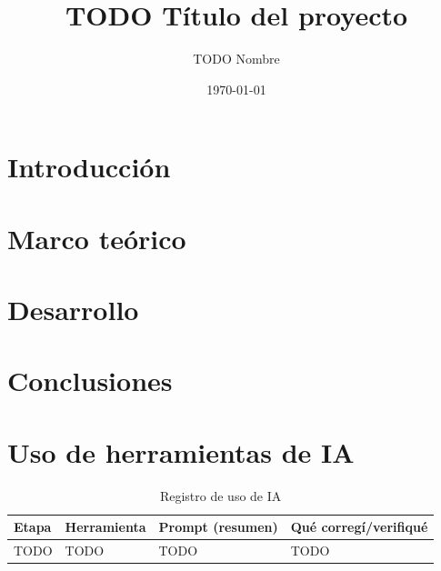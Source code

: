 \documentclass[12pt,a4paper]{article}
\title{TODO Título del proyecto}
\author{TODO Nombre}
\date{\today}
\begin{document}
\maketitle
\tableofcontents
\newpage

\section{Introducción}
\section{Marco teórico}
\section{Desarrollo}
\section{Conclusiones}

\section{Uso de herramientas de IA}
\begin{table}[htbp]
  \centering
  \caption{Registro de uso de IA}
  \label{tab:ia}
  \begin{tabular}{p{3cm}p{2.6cm}p{4cm}p{4cm}}
    \toprule
    Etapa & Herramienta & Prompt (resumen) & Qué corregí/verifiqué \\
    \midrule
    TODO & TODO & TODO & TODO \\
    \bottomrule
  \end{tabular}
\end{table}

\end{document}
